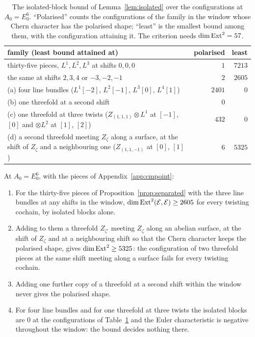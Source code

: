 \begin{table}[t]
\caption{The isolated-block bound of Lemma~\ref{lem:isolated} over the configurations at $A_{0}=E_{0}^{6}$. ``Polarised'' counts the configurations of the family in the window whose Chern character has the polarised shape; ``least'' is the smallest bound among them, with the configuration attaining it. The criterion needs $\dim\mathrm{Ext}^{2}=57$.}
\label{tab:e06count}
\centering
\footnotesize
\setlength{\tabcolsep}{3pt}
\begin{tabular}{@{}p{}rr@{}}
\hline
family (least bound attained at) & polarised & least \\
\hline
thirty-five pieces, $L^{1},L^{2},L^{3}$ at shifts $0,0,0$ & $1$ & $7213$ \\
the same at shifts $2,3,4$ or $-3,-2,-1$ & $2$ & $2605$ \\
(a) four line bundles ($L^{1}[-2]$, $L^{2}[-1]$, $L^{3}[0]$, $L^{4}[1]$) & $2401$ & $0$ \\
(b) one threefold at a second shift & $0$ & \\
(c) one threefold at three twists ($Z_{(1,1,1)}\otimes L^{1}$ at $[-1]$, $[0]$ and $\otimes L^{2}$ at $[1]$, $[2]$) & $432$ & $0$ \\
(d) a second threefold meeting $Z_{\zeta}$ along a surface, at the shift of $Z_{\zeta}$ and a neighbouring one ($Z_{(1,1,-1)}$ at $[0]$, $[1]$) & $6$ & $5325$ \\
\hline
\end{tabular}
\end{table}

\begin{proposition}\label{prop:e06count}
At $A_{0}=E_{0}^{6}$, with the pieces of Appendix~\ref{app:cmpoint}:
\begin{enumerate}[label=\textup{(\roman*)}]
\item For the thirty-five pieces of Proposition~\ref{prop:separated} with the three line bundles at any shifts in the window, $\dim\mathrm{Ext}^{2}(\mathcal{E},\mathcal{E})\ge2605$ for every twisting cochain, by isolated blocks alone.
\item Adding to them a threefold $Z_{\zeta'}$ meeting $Z_{\zeta}$ along an abelian surface, at the shift of $Z_{\zeta}$ and at a neighbouring shift so that the Chern character keeps the polarised shape, gives $\dim\mathrm{Ext}^{2}\ge5325$: the configuration of two threefold pieces at the same shift meeting along a surface fails for every twisting cochain.
\item Adding one further copy of a threefold at a second shift within the window never gives the polarised shape.
\item For four line bundles and for one threefold at three twists the isolated blocks are $0$ at the configurations of Table~\ref{tab:e06count} and the Euler characteristic is negative throughout the window: the bound decides nothing there.
\end{enumerate}
\end{proposition}

